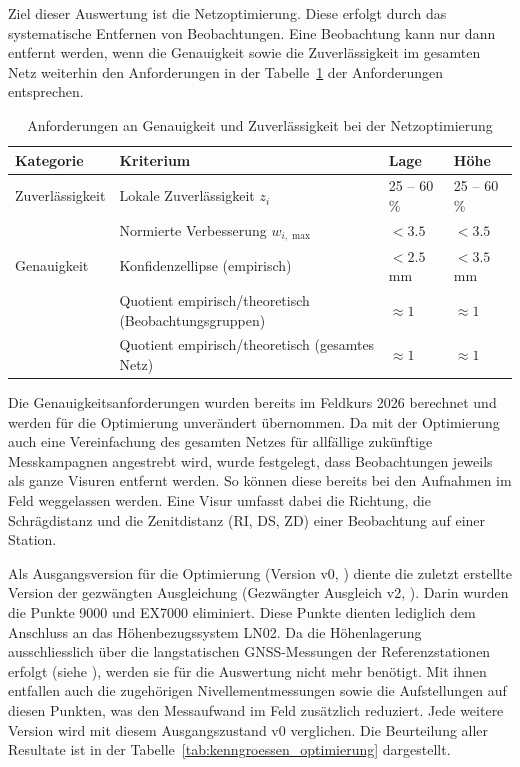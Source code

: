 Ziel dieser Auswertung ist die Netzoptimierung. Diese erfolgt durch das systematische Entfernen von Beobachtungen. 
Eine Beobachtung kann nur dann entfernt werden, wenn die Genauigkeit sowie die Zuverlässigkeit im gesamten Netz 
weiterhin den Anforderungen in der Tabelle~\ref{tab:anforderungen_optimierung} der Anforderungen entsprechen.
\bigskip
\begin{table}[H]
    \centering
    \begin{tabular}{p{2.6cm} p{6.2cm} p{2.0cm} p{2.0cm}}
        \toprule
        Kategorie & Kriterium & Lage & Höhe \\
        \midrule
        Zuverlässigkeit & Lokale Zuverlässigkeit $z_i$                              & 25 -- 60\,\%  & 25 -- 60\,\% \\
                        & Normierte Verbesserung $w_{i,\max}$                       & $< 3.5$       & $< 3.5$ \\
        \midrule
        Genauigkeit     & Konfidenzellipse (empirisch)              & $< 2.5$\,mm   & $< 3.5$\,mm \\
                        & Quotient empirisch/theoretisch (Beobachtungsgruppen)      & $\approx 1$   & $\approx 1$ \\
                        & Quotient empirisch/theoretisch (gesamtes Netz)            & $\approx 1$   & $\approx 1$ \\
        \bottomrule
    \end{tabular}
    \caption{Anforderungen an Genauigkeit und Zuverlässigkeit bei der Netzoptimierung}
    \label{tab:anforderungen_optimierung}
\end{table}
\bigskip
Die Genauigkeitsanforderungen wurden bereits im Feldkurs 2026 berechnet und werden für die Optimierung unverändert übernommen. 
Da mit der Optimierung auch eine Vereinfachung des gesamten Netzes für allfällige zukünftige Messkampagnen angestrebt wird, 
wurde festgelegt, dass Beobachtungen jeweils als ganze Visuren entfernt werden. So können diese bereits bei den Aufnahmen im 
Feld weggelassen werden. Eine Visur umfasst dabei die Richtung, die Schrägdistanz und die Zenitdistanz (RI, DS, ZD) einer 
Beobachtung auf einer Station.\bigskip

Als Ausgangsversion für die Optimierung (Version v0, ) diente die zuletzt erstellte Version der
gezwängten Ausgleichung (Gezwängter Ausgleich v2, ). Darin wurden die Punkte 9000 und EX7000
eliminiert. Diese Punkte dienten lediglich dem Anschluss an das Höhenbezugssystem LN02. Da die Höhenlagerung
ausschliesslich über die langstatischen GNSS-Messungen der Referenzstationen erfolgt (siehe
), werden sie für die Auswertung nicht mehr benötigt. Mit ihnen entfallen
auch die zugehörigen Nivellementmessungen sowie die Aufstellungen auf diesen Punkten, was den Messaufwand im Feld
zusätzlich reduziert. Jede weitere Version wird mit diesem Ausgangszustand v0 verglichen. Die Beurteilung aller 
Resultate ist in der Tabelle~\ref{tab:kenngroessen_optimierung} dargestellt.\bigskip

